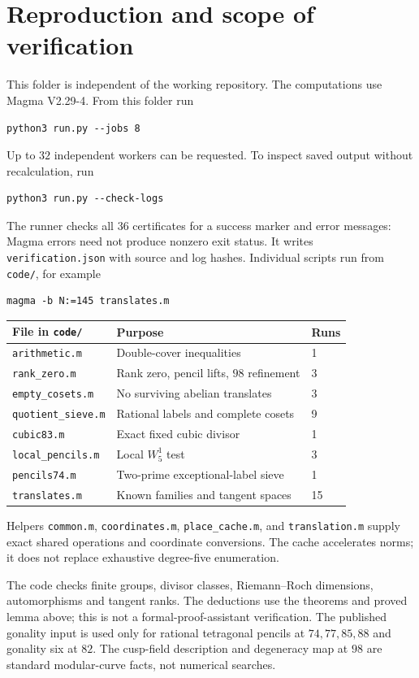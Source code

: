 \documentclass[11pt,a4paper]{article}
\begin{document}
\section{Reproduction and scope of verification}
This folder is independent of the working repository. The computations
use Magma V2.29-4. From this folder run
\begin{verbatim}
python3 run.py --jobs 8
\end{verbatim}
Up to $32$ independent workers can be requested. To inspect saved output
without recalculation, run
\begin{verbatim}
python3 run.py --check-logs
\end{verbatim}
The runner checks all $36$ certificates for a success marker and error
messages: Magma errors need not produce nonzero exit status.
It writes \texttt{verification.json} with source and log hashes.
Individual scripts run from \texttt{code/}, for example
\begin{verbatim}
magma -b N:=145 translates.m
\end{verbatim}
\begin{center}\small
\begin{tabular}{@{}lll@{}}
\toprule File in \texttt{code/}&Purpose&Runs\\
\midrule
\texttt{arithmetic.m}&Double-cover inequalities&1\\
\texttt{rank\_zero.m}&Rank zero, pencil lifts, $98$ refinement&3\\
\texttt{empty\_cosets.m}&No surviving abelian translates&3\\
\texttt{quotient\_sieve.m}&Rational labels and complete cosets&9\\
\texttt{cubic83.m}&Exact fixed cubic divisor&1\\
\texttt{local\_pencils.m}&Local $W^1_5$ test&3\\
\texttt{pencils74.m}&Two-prime exceptional-label sieve&1\\
\texttt{translates.m}&Known families and tangent spaces&15\\
\bottomrule
\end{tabular}
\end{center}
Helpers \texttt{common.m}, \texttt{coordinates.m}, \texttt{place\_cache.m},
and \texttt{translation.m} supply exact shared operations and coordinate
conversions. The cache accelerates norms; it does not replace exhaustive
degree-five enumeration.

The code checks finite groups, divisor classes, Riemann--Roch dimensions,
automorphisms and tangent ranks. The deductions use the theorems and
proved lemma above; this is not a formal-proof-assistant verification.
The published gonality input is used only for rational tetragonal pencils
at $74,77,85,88$ and gonality six at $82$.
The cusp-field description and degeneracy map at $98$ are standard
modular-curve facts, not numerical searches.
\end{document}
